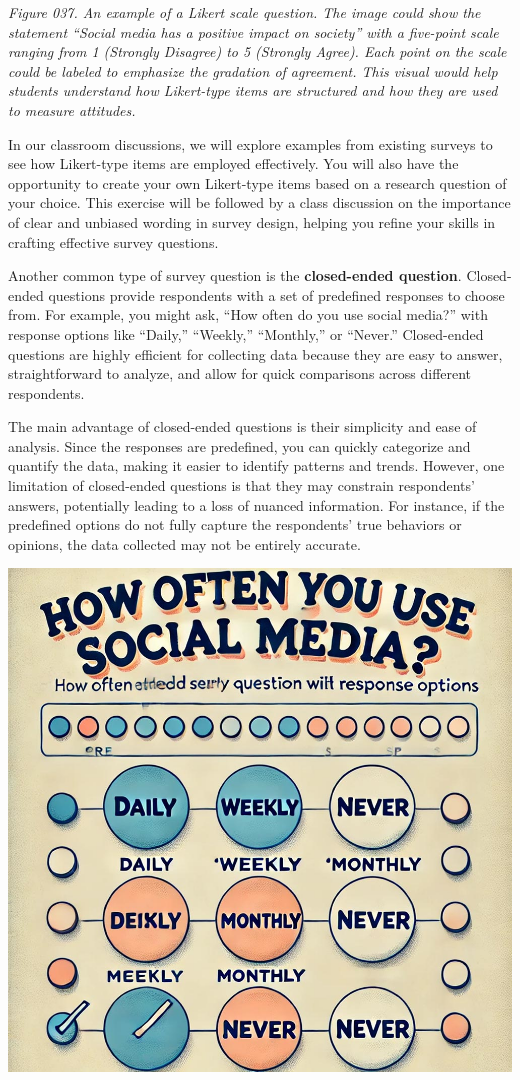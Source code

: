 \documentclass[
]{book}
\begin{document}
\emph{Figure 037. An example of a Likert scale question. The image could show the statement ``Social media has a positive impact on society'' with a five-point scale ranging from 1 (Strongly Disagree) to 5 (Strongly Agree). Each point on the scale could be labeled to emphasize the gradation of agreement. This visual would help students understand how Likert-type items are structured and how they are used to measure attitudes.}

In our classroom discussions, we will explore examples from existing surveys to see how Likert-type items are employed effectively. You will also have the opportunity to create your own Likert-type items based on a research question of your choice. This exercise will be followed by a class discussion on the importance of clear and unbiased wording in survey design, helping you refine your skills in crafting effective survey questions.

Another common type of survey question is the \textbf{closed-ended question}. Closed-ended questions provide respondents with a set of predefined responses to choose from. For example, you might ask, ``How often do you use social media?'' with response options like ``Daily,'' ``Weekly,'' ``Monthly,'' or ``Never.'' Closed-ended questions are highly efficient for collecting data because they are easy to answer, straightforward to analyze, and allow for quick comparisons across different respondents.

The main advantage of closed-ended questions is their simplicity and ease of analysis. Since the responses are predefined, you can quickly categorize and quantify the data, making it easier to identify patterns and trends. However, one limitation of closed-ended questions is that they may constrain respondents' answers, potentially leading to a loss of nuanced information. For instance, if the predefined options do not fully capture the respondents' true behaviors or opinions, the data collected may not be entirely accurate.

\includegraphics[width=1\textwidth,height=\textheight]{images/fig038.jpg}
\end{document}
